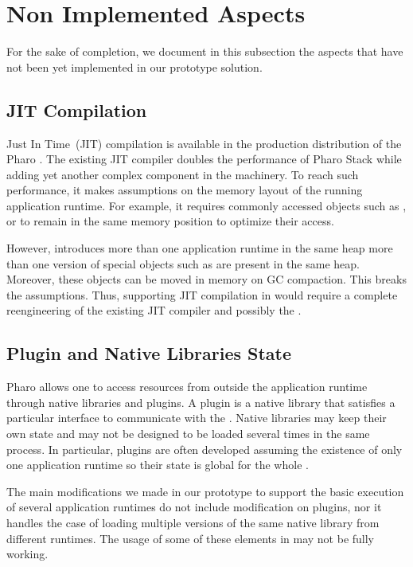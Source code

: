 \section{Non Implemented Aspects} \label{sec:not_yet_implemented}
 
For the sake of completion, we document in this subsection the aspects that have not been yet implemented in our prototype solution.

\subsection{JIT Compilation}

Just In Time~(JIT) compilation is available in the production distribution of the Pharo \VM. The existing JIT compiler doubles the performance of Pharo Stack \VM while adding yet another complex component in the \VM machinery. To reach such performance, it makes assumptions on the memory layout of the running application runtime. For example, it requires commonly accessed objects such as ,  or  to remain in the same memory position to optimize their access.

However, \Vtt introduces more than one application runtime in the same heap \eg more than one version of special objects such as  are present in the same heap. Moreover, these objects can be moved in memory on GC compaction. This breaks the \JIT assumptions. Thus, supporting JIT compilation in \Vtt would require a complete reengineering of the existing JIT compiler and possibly the \VM.

\subsection{Plugin and Native Libraries State}

Pharo \VM allows one to access resources from outside the application runtime through native libraries and \VM plugins. A \VM plugin is a native library that satisfies a particular interface to communicate with the \VM. Native libraries may keep their own state and may not be designed to be loaded several times in the same process. In particular, \VM plugins are often developed assuming the existence of only one application runtime so their state is global for the whole \VM.

The main \VM modifications we made in our prototype to support the basic execution of several application runtimes do not include modification on \VM plugins, nor it handles the case of loading multiple versions of the same native library from different runtimes. The usage of some of these elements in \Vtt may not be fully working.

